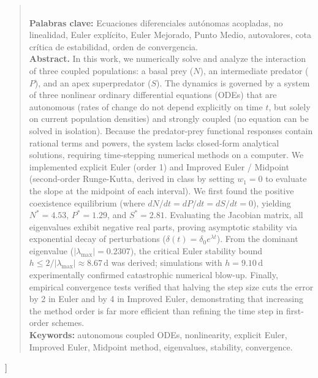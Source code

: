 \documentclass[10pt,twocolumn,a4paper]{article}
\begin{document}
\begin{quotation}
    \\[0.4em]
    \noindent\textbf{Palabras clave:} Ecuaciones diferenciales autónomas acopladas, no linealidad, Euler explícito, Euler Mejorado, Punto Medio, autovalores, cota crítica de estabilidad, orden de convergencia.
    \\[0.6em]
    \footnotesize\noindent\textbf{Abstract.} In this work, we numerically solve and analyze the interaction of three coupled populations: a basal prey ($N$), an intermediate predator ($P$), and an apex superpredator ($S$). The dynamics is governed by a system of three nonlinear ordinary differential equations (ODEs) that are autonomous (rates of change do not depend explicitly on time $t$, but solely on current population densities) and strongly coupled (no equation can be solved in isolation). Because the predator-prey functional responses contain rational terms and powers, the system lacks closed-form analytical solutions, requiring time-stepping numerical methods on a computer. We implemented explicit Euler (order 1) and Improved Euler / Midpoint (second-order Runge-Kutta, derived in class by setting $w_1 = 0$ to evaluate the slope at the midpoint of each interval). We first found the positive coexistence equilibrium (where $dN/dt = dP/dt = dS/dt = 0$), yielding $N^* = 4.53$, $P^* = 1.29$, and $S^* = 2.81$. Evaluating the Jacobian matrix, all eigenvalues exhibit negative real parts, proving asymptotic stability via exponential decay of perturbations ($\delta(t) = \delta_0 e^{\lambda t}$). From the dominant eigenvalue ($|\lambda_{\max}| = 0.2307$), the critical Euler stability bound $h \le 2/|\lambda_{\max}| \approx 8.67\,\text{d}$ was derived; simulations with $h = 9.10\,\text{d}$ experimentally confirmed catastrophic numerical blow-up. Finally, empirical convergence tests verified that halving the step size cuts the error by 2 in Euler and by 4 in Improved Euler, demonstrating that increasing the method order is far more efficient than refining the time step in first-order schemes.
    \\[0.4em]
    \noindent\textbf{Keywords:} autonomous coupled ODEs, nonlinearity, explicit Euler, Improved Euler, Midpoint method, eigenvalues, stability, convergence.
  \end{quotation}
  \vspace{1.0em}
]

\let\thefootnote\relax{}
\end{document}
